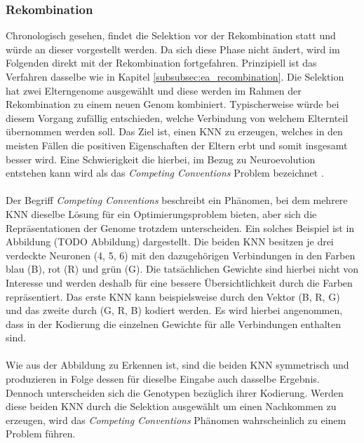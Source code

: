 \subsubsection{Rekombination}
Chronologisch gesehen, findet die Selektion vor der Rekombination statt und würde an dieser vorgestellt werden. Da sich diese Phase nicht ändert, wird im Folgenden direkt mit der Rekombination fortgefahren. Prinzipiell ist das Verfahren dasselbe wie in Kapitel \ref{subsubsec:ea_recombination}. Die Selektion hat zwei Elterngenome ausgewählt und diese werden im Rahmen der Rekombination zu einem neuen Genom kombiniert. Typischerweise würde bei diesem Vorgang zufällig entschieden, welche Verbindung von welchem Elternteil übernommen werden soll. Das Ziel ist, einen \ac{KNN} zu erzeugen, welches in den meisten Fällen die positiven Eigenschaften der Eltern erbt und somit insgesamt besser wird. Eine Schwierigkeit die hierbei, im Bezug zu Neuroevolution entstehen kann wird als das \emph{Competing Conventions} Problem bezeichnet \cite{stanley2002evolving}.
\\\\ %
Der Begriff \emph{Competing Conventions} beschreibt ein Phänomen, bei dem mehrere \ac{KNN} dieselbe Lösung für ein Optimierungsproblem bieten, aber sich die Repräsentationen der Genome trotzdem unterscheiden. Ein solches Beispiel ist in Abbildung (TODO Abbildung) dargestellt. Die beiden \ac{KNN} besitzen je drei verdeckte Neuronen (4, 5, 6) mit den dazugehörigen Verbindungen in den Farben blau (B), rot (R) und grün (G). Die tatsächlichen Gewichte sind hierbei nicht von Interesse und werden deshalb für eine bessere Übersichtlichkeit durch die Farben repräsentiert. Das erste \ac{KNN} kann beispielsweise durch den Vektor (B, R, G) und das zweite durch (G, R, B) kodiert werden. Es wird hierbei angenommen, dass in der Kodierung die einzelnen Gewichte für alle Verbindungen enthalten sind. \\\\
Wie aus der Abbildung zu Erkennen ist, sind die beiden \ac{KNN} symmetrisch und produzieren in Folge dessen für dieselbe Eingabe auch dasselbe Ergebnis. Dennoch unterscheiden sich die Genotypen bezüglich ihrer Kodierung. Werden diese beiden \ac{KNN} durch die Selektion ausgewählt um einen Nachkommen zu erzeugen, wird das \emph{Competing Conventions} Phänomen wahrscheinlich zu einem Problem führen. \\\\
